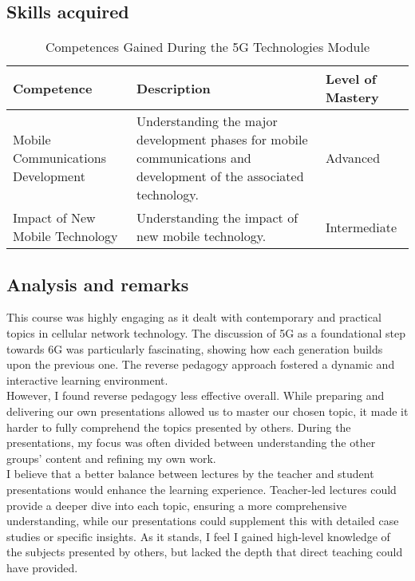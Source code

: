 \subsection{Skills acquired}
\begin{table}[h!]
    \centering
    \begin{tabular}{|p{3.5cm}|p{8cm}|p{3.5cm}|}
    \hline
    \textbf{Competence} & \textbf{Description} & \textbf{Level of Mastery} \\
    \hline
    Mobile Communications Development & Understanding the major development phases for mobile communications and development of the associated technology. & Advanced \\
    \hline
    Impact of New Mobile Technology & Understanding the impact of new mobile technology. & Intermediate \\
    \hline
    \end{tabular}
    \caption{Competences Gained During the 5G Technologies Module}
\end{table}

\subsection{Analysis and remarks}
This course was highly engaging as it dealt with contemporary and practical topics in cellular network technology. The discussion of 5G as a foundational step towards 6G was particularly fascinating, showing how each generation builds upon the previous one. The reverse pedagogy approach fostered a dynamic and interactive learning environment.
\\
However, I found reverse pedagogy less effective overall. While preparing and delivering our own presentations allowed us to master our chosen topic, it made it harder to fully comprehend the topics presented by others. During the presentations, my focus was often divided between understanding the other groups' content and refining my own work.
\\
I believe that a better balance between lectures by the teacher and student presentations would enhance the learning experience. Teacher-led lectures could provide a deeper dive into each topic, ensuring a more comprehensive understanding, while our presentations could supplement this with detailed case studies or specific insights. As it stands, I feel I gained high-level knowledge of the subjects presented by others, but lacked the depth that direct teaching could have provided.